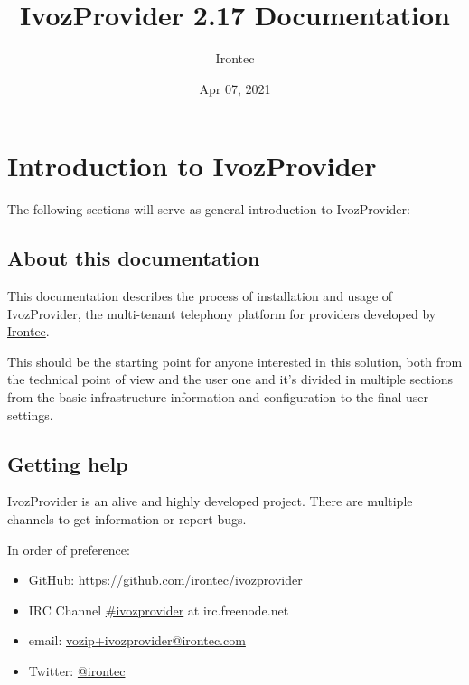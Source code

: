 \documentclass[letterpaper,10pt,english]{sphinxmanual}
\title{IvozProvider 2.17 Documentation}
\date{Apr 07, 2021}
\author{Irontec}
\begin{document}
\maketitle
\tableofcontents
{}\label{index::doc}



\chapter{Introduction to IvozProvider}
\label{basic_concepts/intro/index::doc}\label{basic_concepts/intro/index:introduction-to-ivozprovider}\label{basic_concepts/intro/index:ivozprovider-official-documentation}
The following sections will serve as general introduction to IvozProvider:


\section{About this documentation}
\label{basic_concepts/intro/about::doc}\label{basic_concepts/intro/about:about-this-documentation}
This documentation describes the process of installation and usage of
IvozProvider, the multi-tenant telephony platform for providers developed
by \href{http://irontec.com}{Irontec}.

This should be the starting point for anyone interested in this solution,
both from the technical point of view and the user one and it's divided
in multiple sections from the basic infrastructure information and configuration
to the final user settings.


\section{Getting help}
\label{basic_concepts/intro/getting_help:getting-help}\label{basic_concepts/intro/getting_help::doc}\label{basic_concepts/intro/getting_help:id1}
IvozProvider is an alive and highly developed project. There are
multiple channels to get information or report bugs.

In order of preference:
\begin{itemize}
\item {} 
GitHub: \url{https://github.com/irontec/ivozprovider}

\item {} 
IRC Channel \href{https://webchat.freenode.net/?channels=ivozprovider}{\#ivozprovider} at irc.freenode.net

\item {} 
email: \href{mailto:vozip+ivozprovider@irontec.com}{vozip+ivozprovider@irontec.com}

\item {} 
Twitter: \href{https://twitter.com/irontec}{@irontec}

\end{itemize}
\end{document}
